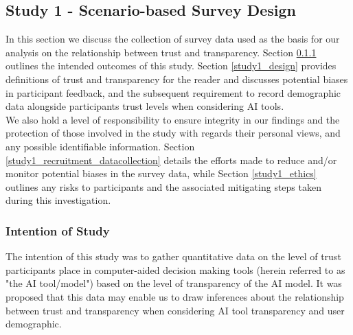 \documentclass[manuscript,screen,review]{acmart}
\begin{document}




\subsection{Study 1 - Scenario-based Survey Design}
In this section we discuss the collection of survey data used as the basis for our analysis on the relationship between trust and transparency. Section \ref{study1_intentions} outlines the intended outcomes of this study. Section \ref{study1_design} provides definitions of trust and transparency for the reader and discusses potential biases in participant feedback, and the subsequent requirement to record demographic data alongside participants trust levels when considering AI tools.\\

We also hold a level of responsibility to ensure integrity in our findings and the protection of those involved in the study with regards their personal views, and any possible identifiable information. Section \ref{study1_recruitment_datacollection} details the efforts made to reduce and/or monitor potential biases in the survey data, while Section \ref{study1_ethics} outlines any risks to participants and the associated mitigating steps taken during this investigation.
\subsubsection{Intention of Study} 
\label{study1_intentions}
The intention of this study was to gather quantitative data on the level of trust participants place in computer-aided decision making tools (herein referred to as "the AI tool/model") based on the level of transparency of the AI model. It was proposed that this data may enable us to draw inferences about the relationship between trust and transparency when considering AI tool transparency and user demographic. 
\end{document}
